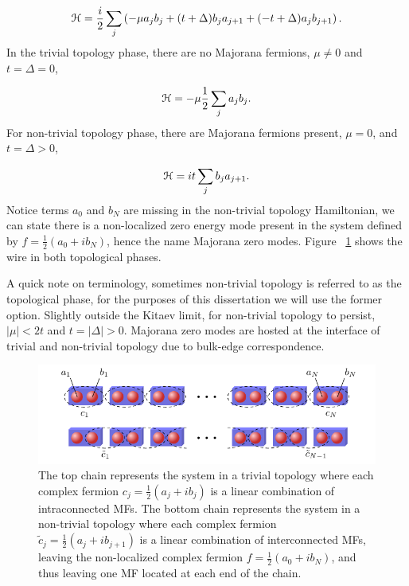 \begin{equation}
  \mathcal{H} = \dfrac{i}{2} \sum_j \left( -\mu a_j b_j + (t+\Delta) b_j a_{j+1} + (-t+\Delta) a_j b_{j+1} \right).
\end{equation}
In the trivial topology phase, there are no Majorana fermions, $\mu \neq 0$ and $t=\Delta=0$,

\begin{equation}
  \mathcal{H} = -\mu\dfrac{1}{2} \sum_j a_j b_j.
\end{equation}
For non-trivial topology phase, there are Majorana fermions present, $\mu = 0$, and $t = \Delta > 0$,

\begin{equation}
  \mathcal{H} = it \sum_j b_j a_{j+1}.
\end{equation}
Notice terms $a_0$ and $b_N$ are missing in the non-trivial topology Hamiltonian, we can state there is a non-localized zero energy mode present in the system defined by $f = \tfrac{1}{2}(a_0 + i b_N)$, hence the name Majorana zero modes.
Figure ~\ref{fig:kitaev-chain} shows the wire in both topological phases.

A quick note on terminology, sometimes non-trivial topology is referred to as the topological phase, for the purposes of this dissertation we will use the former option.
Slightly outside the Kitaev limit, for non-trivial topology to persist, $|\mu| < 2t$ and $t = |\Delta| >0$.
Majorana zero modes are hosted at the interface of trivial and non-trivial topology due to bulk-edge correspondence.

\begin{figure}
  \includegraphics[width=\textwidth]{./figures/kitaev-chain.pdf}
  \caption{The top chain represents the system in a trivial topology where each complex fermion $c_j = \tfrac{1}{2}(a_j + i b_j)$ is a linear combination of intraconnected MFs. The bottom chain represents the system in a non-trivial topology where each complex fermion $\tilde{c}_j = \tfrac{1}{2}(a_j + i b_{j+1})$ is a linear combination of interconnected MFs, leaving the non-localized complex fermion $f = \tfrac{1}{2}(a_0 + i b_N)$, and thus leaving one MF located at each end of the chain.}
  \label{fig:kitaev-chain}
\end{figure}

